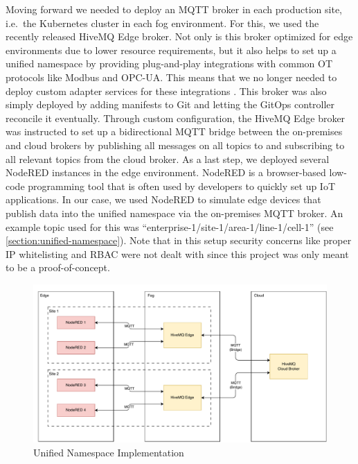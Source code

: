         Moving forward we needed to deploy an MQTT broker in each production site, i.e.\ the Kubernetes cluster in each fog environment. For this, we used the recently released HiveMQ Edge broker. Not only is this broker optimized for edge environments due to lower resource requirements, but it also helps to set up a unified namespace by providing plug-and-play integrations with common OT protocols like Modbus and OPC-UA. This means that we no longer needed to deploy custom adapter services for these integrations \cite{hivemq_edge_website}. This broker was also simply deployed by adding manifests to Git and letting the GitOps controller reconcile it eventually. Through custom configuration, the HiveMQ Edge broker was instructed to set up a bidirectional MQTT bridge between the on-premises and cloud brokers by publishing all messages on all topics to and subscribing to all relevant topics from the cloud broker. As a last step, we deployed several NodeRED instances in the edge environment. NodeRED is a browser-based low-code programming tool that is often used by developers to quickly set up IoT applications. In our case, we used NodeRED to simulate edge devices that publish data into the unified namespace via the on-premises MQTT broker. An example topic used for this was ``enterprise-1/site-1/area-1/line-1/cell-1'' (see \autoref{section:unified-namespace}). Note that in this setup security concerns like proper IP whitelisting and RBAC were not dealt with since this project was only meant to be a proof-of-concept. 

        \begin{figure}[htbp]
            \centering
            \includegraphics[width=\textwidth]{img/uns-poc.pdf}
            \caption{Unified Namespace Implementation}
            \label{figure:uns-poc}
        \end{figure}

